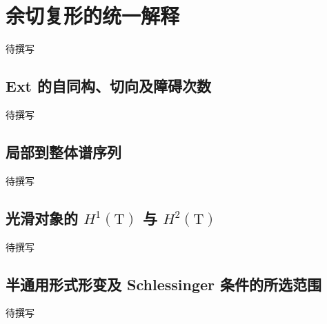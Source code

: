 
% 
% 

\section{余切复形的统一解释}
\label{g5:sec:3204}

待撰写

\subsection{Ext 的自同构、切向及障碍次数}
\label{g5:subsec:3204:01}
待撰写

\subsection{局部到整体谱序列}
\label{g5:subsec:3204:02}
待撰写

\subsection{\texorpdfstring{光滑对象的 \(H^1(\mathrm{T})\) 与 \(H^2(\mathrm{T})\)}{光滑对象的 H¹(T) 与 H²(T)}}
\label{g5:subsec:3204:03}
待撰写

\subsection{半通用形式形变及 Schlessinger 条件的所选范围}
\label{g5:subsec:3204:04}
待撰写
